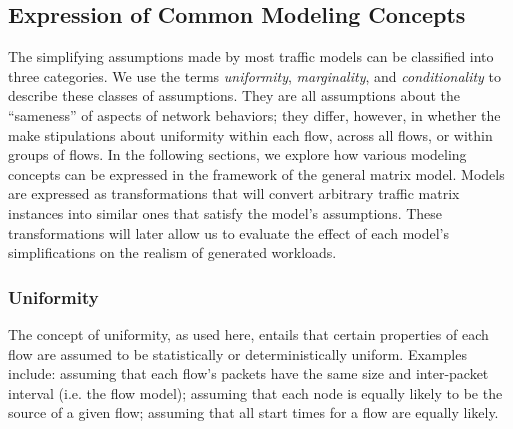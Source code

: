 \documentclass[twocolumn,final]{svjour3}
\begin{document}
\subsection{Expression of Common Modeling Concepts}

The simplifying assumptions made by most traffic models can be classified into three categories. We use the terms \textit{uniformity}, \textit{marginality}, and \textit{conditionality} to describe these classes of assumptions. They are all assumptions about the ``sameness'' of aspects of network behaviors; they differ, however, in whether the make stipulations about uniformity within each flow, across all flows, or within groups of flows. In the following sections, we explore how various modeling concepts can be expressed in the framework of the general matrix model. Models are expressed as transformations that will convert arbitrary traffic matrix instances into similar ones that satisfy the model's assumptions. These transformations will later allow us to evaluate the effect of each model's simplifications on the realism of generated workloads.

\subsubsection{Uniformity}

The concept of uniformity, as used here, entails that certain properties of each flow are assumed to be statistically or deterministically uniform. Examples include: assuming that each flow's packets have the same size and inter-packet interval (i.e. the  flow model); assuming that each node is equally likely to be the source of a given flow; assuming that all start times for a flow are equally likely.
\end{document}
